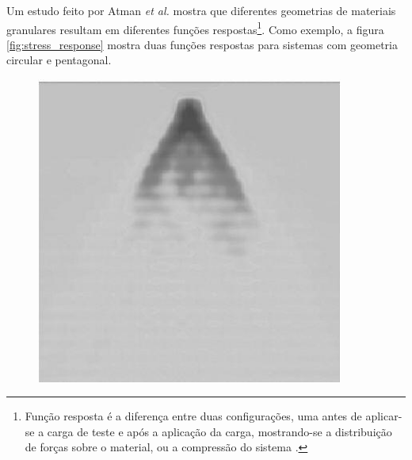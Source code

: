     Um estudo feito por Atman \textit{et al.} \cite{Sensitivity_of_Stress_Response_Function_to_Packing_Preparation} mostra que diferentes geometrias de materiais granulares resultam em diferentes funções respostas\footnote{Função resposta é a diferença entre duas configurações, uma antes de aplicar-se a carga de teste e após a aplicação da carga, mostrando-se a distribuição de forças sobre o material, ou a compressão do sistema \cite{The_Physics_of_Granular_Media}.}. Como exemplo, a figura \ref{fig:stress_response} mostra duas funções respostas para sistemas com geometria circular e pentagonal.

\begin{figure}
    \centering
    \begin{minipage}{.45\linewidth}
        \centering
        \includegraphics[width=0.9\textwidth]{04-figuras/Funcao_Resposta1.png}
        \label{fig:stress_response:circle}
    \end{minipage}
    \begin{minipage}{.45\linewidth}
        \centering

\end{minipage}
\end{figure}

